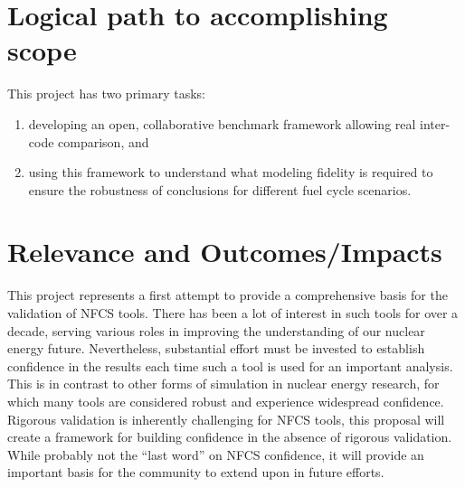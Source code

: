 \section{Logical path to accomplishing scope}

This project has two primary tasks:
\begin{enumerate}
\item developing an open, collaborative benchmark framework allowing real
  inter-code comparison, and
\item using this framework to understand what modeling fidelity is required to
  ensure the robustness of conclusions for different fuel cycle scenarios.
\end{enumerate}






\section{Relevance and Outcomes/Impacts}

This project represents a first attempt to provide a comprehensive basis for
the validation of \gls{NFCS} tools.  There has been a lot of interest in such
tools for over a decade, serving various roles in improving the understanding
of our nuclear energy future.  Nevertheless, substantial effort must be
invested to establish confidence in the results each time such a tool is used
for an important analysis.  This is in contrast to other forms of simulation
in nuclear energy research, for which many tools are considered robust and
experience widespread confidence.  Rigorous validation is inherently
challenging for \gls{NFCS} tools, this proposal will create a framework for
building confidence in the absence of rigorous validation.  While probably
not the ``last word'' on \gls{NFCS} confidence, it will provide an important
basis for the community to extend upon in future efforts.

